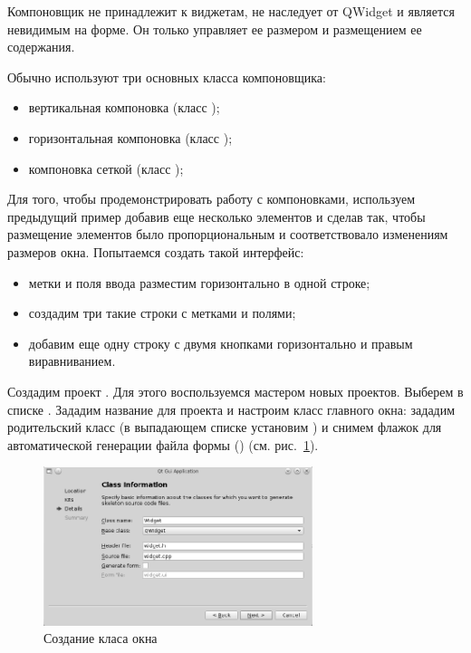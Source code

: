 Компоновщик не принадлежит к виджетам, не наследует от QWidget и является невидимым на форме. Он только управляет ее
размером и размещением ее содержания.

Обычно используют три основных класса компоновщика:

\begin{itemize}
\item вертикальная компоновка (класс );
\item горизонтальная компоновка (класс );
\item компоновка сеткой (класс );
\end{itemize}
Для того, чтобы продемонстрировать работу с компоновками, используем предыдущий пример добавив еще несколько элементов и
сделав так, чтобы размещение элементов было пропорциональным и соответствовало изменениям размеров окна. Попытаемся
создать такой интерфейс:

\begin{itemize}
\item метки и поля ввода разместим горизонтально в одной строке;
\item создадим три такие строки с метками и полями;
\item добавим еще одну строку с двумя кнопками горизонтально и правым виравниванием.
\end{itemize}

Создадим проект . Для этого воспользуемся
мастером новых проектов. Выберем в списке . Зададим название для
проекта и настроим класс главного окна: зададим родительский класс (в выпадающем списке  установим
) и снимем флажок для автоматической генерации файла формы () 
(см. рис.~\ref{ch13:refDrawing3}).

\begin{figure}[htb]
\begin{center}
\includegraphics[width=0.7\textwidth]{img/ris_13_4}
\caption[Создание класа окна]{Создание класа окна}
\label{ch13:refDrawing3}
\end{center}
\end{figure}

